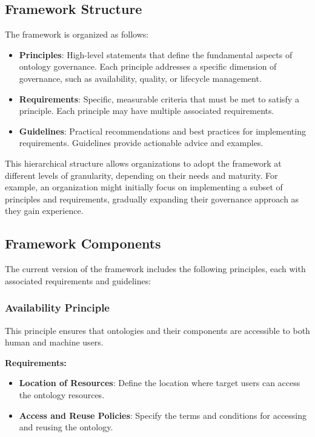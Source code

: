 \documentclass[conference]{IEEEtran}
\begin{document}
\subsection{Framework Structure}

The framework is organized as follows:

\begin{itemize}
    \item \textbf{Principles}: High-level statements that define the fundamental aspects of ontology governance. Each principle addresses a specific dimension of governance, such as availability, quality, or lifecycle management.
    \item \textbf{Requirements}: Specific, measurable criteria that must be met to satisfy a principle. Each principle may have multiple associated requirements.
    \item \textbf{Guidelines}: Practical recommendations and best practices for implementing requirements. Guidelines provide actionable advice and examples.
\end{itemize}

This hierarchical structure allows organizations to adopt the framework at different levels of granularity, depending on their needs and maturity. For example, an organization might initially focus on implementing a subset of principles and requirements, gradually expanding their governance approach as they gain experience.

\subsection{Framework Components}

The current version of the framework includes the following principles, each with associated requirements and guidelines:

\subsubsection{Availability Principle}
This principle ensures that ontologies and their components are accessible to both human and machine users.

\textbf{Requirements:}
\begin{itemize}
    \item \textbf{Location of Resources}: Define the location where target users can access the ontology resources.
    \item \textbf{Access and Reuse Policies}: Specify the terms and conditions for accessing and reusing the ontology.
\end{itemize}
\end{document}
